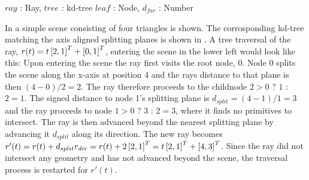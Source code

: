 \begin{algorithm}
  \caption{A basic kd-tree traversal algorithm}
  \label{alg:generalTraversal}
  \begin{algorithmic}
              {$ray$ : Ray, $tree$ : kd-tree}
              {$leaf$ : Node, $d_{far}$ : Number}{
                  \ELSE
                  \ENDIF
                \ENDWHILE
              }
  \end{algorithmic}
\end{algorithm}

In  a simple scene consisting of four triangles is
shown. The corrosponding kd-tree matching the axis aligned splitting planes is
shown in . A tree traversal of the ray, $r(t) = t
\left[2, 1 \right]^T + \left[0, 1 \right]^T$, entering the scene in the lower left would
look like this: Upon entering the scene the ray first visits the root node,
0. Node 0 splits the scene along the x-axis at position 4 and the rays distance
to that plane is then $(4 - 0) / 2 = 2$. The ray therefore proceeds to the
childnode $2 > 0$ ? $1$ : $2 = 1$. The signed distance to node 1's splitting
plane is $d_{split} = (4 - 1) / 1 = 3$ and the ray proceeds to node $1 > 0$ ?
$3$ : $2 = 3$, where it finds no primitives to intersect. The ray is then
advanced beyond the nearest splitting plane by advancing it $d_{split}$ along
its direction. The new ray becomes $r'(t) = r(t) + d_{split} r_{dir} = r(t) + 2
\left[2, 1 \right]^T = t \left[2, 1 \right]^T + \left[4, 3 \right]^T$. Since the ray did not
intersect any geometry and has not advanced beyond the scene, the traversal
process is restarted for $r'(t)$.



